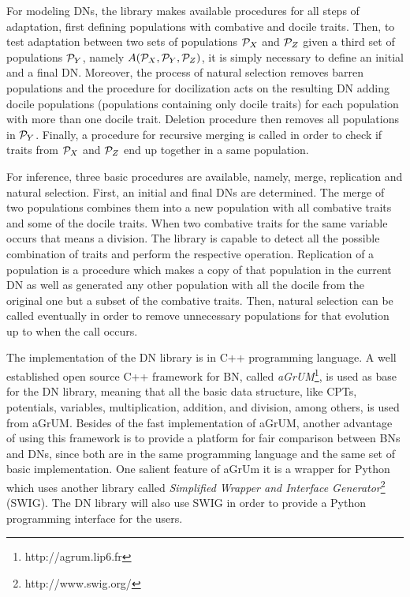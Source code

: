 For modeling DNs, the library makes available procedures for all steps of adaptation, first defining populations with combative and docile traits.
Then, to test adaptation between two sets of populations ${\cal P}_X$ and ${\cal P}_Z$ given a third set of populations ${\cal P}_Y$, namely $A({\cal P}_X, {\cal P}_Y, {\cal P}_Z)$, it is simply necessary to define an initial and a final DN.
Moreover, the process of natural selection removes barren populations and the procedure for docilization acts on the resulting DN adding docile populations (populations containing only docile traits) for each population with more than one docile trait.
Deletion procedure then removes all populations in ${\cal P}_Y$.
Finally, a procedure for recursive merging is called in order to check if traits from ${\cal P}_X$ and ${\cal P}_Z$ end up together in a same population.

For inference, three basic procedures are available, namely, merge, replication and natural selection.
First, an initial and final DNs are determined.
The merge of two populations combines them into a new population with all combative traits and some of the docile traits.
When two combative traits for the same variable occurs that means a division.
The library is capable to detect all the possible combination of traits and perform the respective operation.
Replication of a population is a procedure which makes a copy of that population in the current DN as well as generated any other population with all the docile from the original one but a subset of the combative traits.
Then, natural selection can be called eventually in order to remove unnecessary populations for that evolution up to when the call occurs.

The implementation of the DN library is in C++ programming language.
A well established open source C++ framework for BN, called \emph{aGrUM}\footnote{http://agrum.lip6.fr}, is used as base for the DN library, meaning that all the basic data structure, like CPTs, potentials, variables, multiplication, addition, and division, among others, is used from aGrUM.
Besides of the fast implementation of aGrUM, another advantage of using this framework is to provide a platform for fair comparison between BNs and DNs, since both are in the same programming language and the same set of basic implementation.
One salient feature of aGrUm it is a wrapper for Python which uses another library called \emph{Simplified Wrapper and Interface Generator}\footnote{http://www.swig.org/} (SWIG).
The DN library will also use SWIG in order to provide a Python programming interface for the users.

